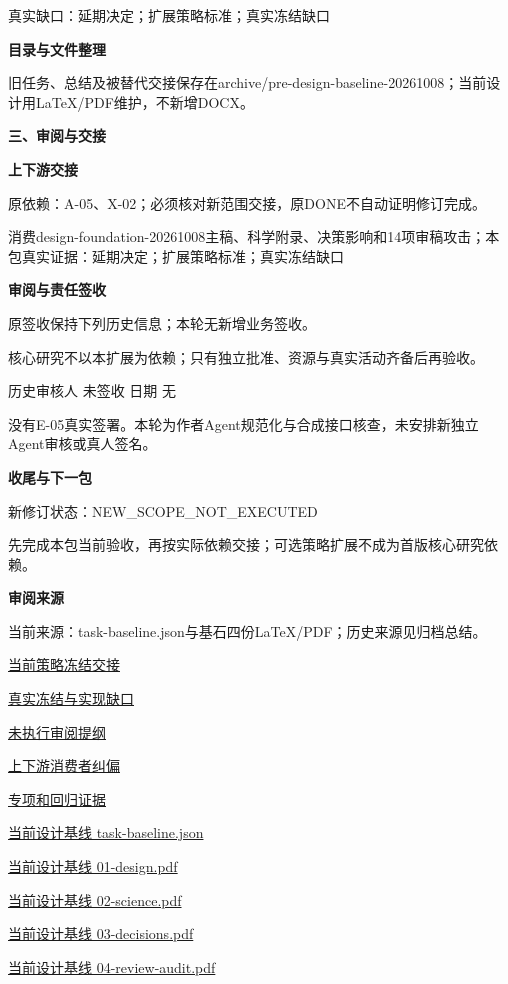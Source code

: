 \documentclass[11pt,a4paper]{article}
\newcommand{\reviewsection}[1]{\par\Needspace{5\baselineskip}\vspace{10pt}\begin{center}{\titlelatin\titlecjk\bfseries\fontsize{14}{20}\selectfont #1}\end{center}}
\newcommand{\reviewsubsection}[1]{\par\Needspace{4\baselineskip}\vspace{4pt}\begin{center}{\titlelatin\titlecjk\bfseries\fontsize{12}{18}\selectfont #1}\end{center}}
\begin{document}
真实缺口：延期决定；扩展策略标准；真实冻结缺口


\reviewsubsection{2.4 目录与文件整理}
旧任务、总结及被替代交接保存在archive/\allowbreak{}pre-\allowbreak{}design-\allowbreak{}baseline-\allowbreak{}20261008；当前设计用LaTeX/\allowbreak{}PDF维护，不新增DOCX。


\reviewsection{三、审阅与交接}
\reviewsubsection{3.1 上下游交接}
原依赖：A-\allowbreak{}05、X-\allowbreak{}02；必须核对新范围交接，原DONE不自动证明修订完成。


消费design-\allowbreak{}foundation-\allowbreak{}20261008主稿、科学附录、决策影响和14项审稿攻击；本包真实证据：延期决定；扩展策略标准；真实冻结缺口


\reviewsubsection{3.2 审阅与责任签收}
原签收保持下列历史信息；本轮无新增业务签收。


核心研究不以本扩展为依赖；只有独立批准、资源与真实活动齐备后再验收。


历史审核人 未签收    日期 无


没有E-\allowbreak{}05真实签署。本轮为作者Agent规范化与合成接口核查，未安排新独立Agent审核或真人签名。


\reviewsubsection{3.3 收尾与下一包}
新修订状态：NEW\_\allowbreak{}SCOPE\_\allowbreak{}NOT\_\allowbreak{}EXECUTED


先完成本包当前验收，再按实际依赖交接；可选策略扩展不成为首版核心研究依赖。


\reviewsubsection{3.4 审阅来源}
当前来源：task-\allowbreak{}baseline.json与基石四份LaTeX/\allowbreak{}PDF；历史来源见归档总结。


\href{file:///D:/Agent/srp/agent/tasks/E-05/outputs/current-freeze.md}{当前策略冻结交接}


\href{file:///D:/Agent/srp/agent/tasks/E-05/outputs/current-freeze.json}{真实冻结与实现缺口}


\href{file:///D:/Agent/srp/agent/tasks/E-05/outputs/policy-review-template.json}{未执行审阅提纲}


\href{file:///D:/Agent/srp/agent/tasks/E-05/evidence/consumer-impact.md}{上下游消费者纠偏}


\href{file:///D:/Agent/srp/agent/tasks/E-05/evidence/verification.json}{专项和回归证据}


\href{file:///D:/Agent/srp/agent/design/design-foundation-20261008/task-baseline.json}{当前设计基线 task-\allowbreak{}baseline.json}


\href{file:///D:/Agent/srp/agent/design/design-foundation-20261008/01-design.pdf}{当前设计基线 01-\allowbreak{}design.pdf}


\href{file:///D:/Agent/srp/agent/design/design-foundation-20261008/02-science.pdf}{当前设计基线 02-\allowbreak{}science.pdf}


\href{file:///D:/Agent/srp/agent/design/design-foundation-20261008/03-decisions.pdf}{当前设计基线 03-\allowbreak{}decisions.pdf}


\href{file:///D:/Agent/srp/agent/design/design-foundation-20261008/04-review-audit.pdf}{当前设计基线 04-\allowbreak{}review-\allowbreak{}audit.pdf}
\end{document}
